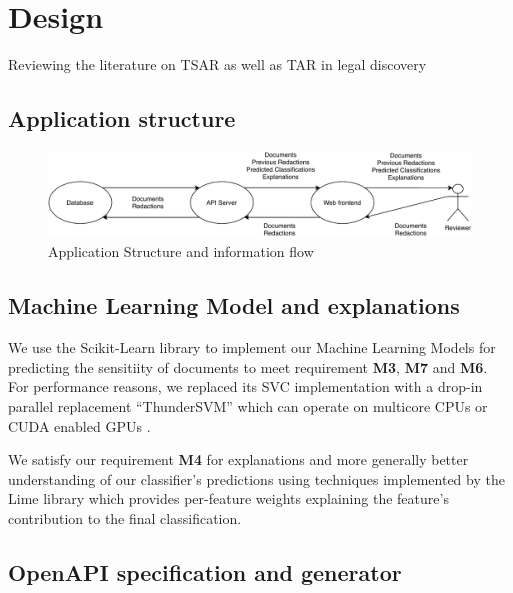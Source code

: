 \documentclass[\version]{l4proj}
\begin{document}
\chapter{Design}

Reviewing the literature on TSAR as well as TAR in legal discovery


\section{Application structure}

\begin{figure}[H]
    \centering
    \includegraphics[width=\textwidth]{figures/design_diagram.pdf}
    \caption{Application Structure and information flow}\label{fig:design_diagram}
\end{figure}

\section{Machine Learning Model and explanations}

We use the Scikit-Learn library to implement our Machine Learning Models \autocite{pedregosaScikitlearnMachineLearning2011} for predicting the sensitiity of documents to meet requirement \textbf{M3}, \textbf{M7} and \textbf{M6}. For performance reasons, we replaced its SVC implementation with a drop-in parallel replacement ``ThunderSVM'' which can operate on multicore CPUs or CUDA enabled GPUs \autocite{wenThunderSVMFastSVM2018}.

We satisfy our requirement \textbf{M4} for explanations and more generally better understanding of our classifier's predictions using techniques implemented by the Lime library \autocite{ribeiroWhyShouldTrust2016} which provides per-feature weights explaining the feature's contribution to the final classification.

\section{OpenAPI specification and generator}
\end{document}
